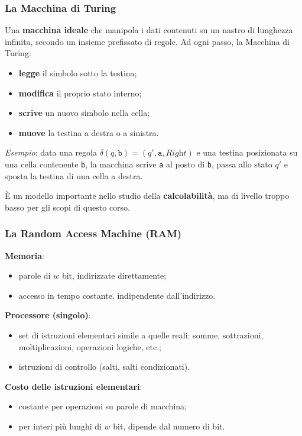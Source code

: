 \documentclass[12pt, a4paper]{article}
\begin{document}
\subsubsection{La Macchina di Turing}

Una \textbf{macchina ideale} che manipola i dati contenuti su un nastro di lunghezza infinita, secondo un insieme prefissato di regole. Ad ogni passo, la Macchina di Turing:
\begin{itemize}
    \item \textbf{legge} il simbolo sotto la testina;
    \item \textbf{modifica} il proprio stato interno;
    \item \textbf{scrive} un nuovo simbolo nella cella;
    \item \textbf{muove} la testina a destra o a sinistra.
\end{itemize}

\textit{Esempio}: data una regola $\delta(q, \texttt{b}) = (q', \texttt{a}, \textit{Right})$ e una testina posizionata su una cella contenente \texttt{b}, la macchina scrive \texttt{a} al posto di \texttt{b}, passa allo stato $q'$ e sposta la testina di una cella a destra.

È un modello importante nello studio della \textbf{calcolabilità}, ma di livello troppo basso per gli scopi di questo corso.

\subsubsection{La Random Access Machine (RAM)}

\textbf{Memoria}:
\begin{itemize}
    \item parole di $w$ bit, indirizzate direttamente;
    \item accesso in tempo costante, indipendente dall'indirizzo.
\end{itemize}

\textbf{Processore (singolo)}:
\begin{itemize}
    \item set di istruzioni elementari simile a quelle reali: somme, sottrazioni, moltiplicazioni, operazioni logiche, etc.;
    \item istruzioni di controllo (salti, salti condizionati).
\end{itemize}

\textbf{Costo delle istruzioni elementari}:
\begin{itemize}
    \item costante per operazioni su parole di macchina;
    \item per interi più lunghi di $w$ bit, dipende dal numero di bit.
\end{itemize}
\end{document}
